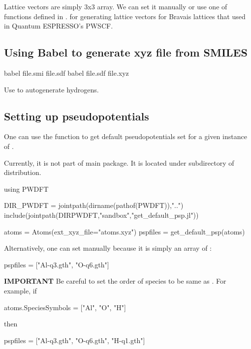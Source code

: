 Lattice vectors are simply 3x3 array. We can set it manually or use
one of functions defined in .
for generating lattice vectors for Bravais lattices that used
in Quantum ESPRESSO's PWSCF.

\subsection*{Using Babel to generate xyz file from SMILES}

\begin{textcode}
babel file.smi file.sdf
babel file.sdf file.xyz
\end{textcode}

Use  to autogenerate hydrogens.



\subsection*{Setting up pseudopotentials}

One can use the function  to get default
pseudopotentials set for a given instance of .

Currently, it is not part of main  package. It is located
under  subdirectory of  distribution.

\begin{juliacode}
using PWDFT

DIR_PWDFT = jointpath(dirname(pathof(PWDFT)),"..")
include(jointpath(DIRPWDFT,"sandbox","get_default_psp.jl"))

atoms = Atoms(ext_xyz_file="atoms.xyz")
pspfiles = get_default_psp(atoms)
\end{juliacode}

Alternatively, one can set  manually because it is simply
an array of :
\begin{juliacode}
pspfiles = ["Al-q3.gth", "O-q6.gth"]
\end{juliacode}

\textbf{IMPORTANT} Be careful to set the order of species to be same as
. For example, if
\begin{juliacode}
atoms.SpeciesSymbols = ["Al", "O", "H"]
\end{juliacode}
then
\begin{juliacode}
pspfiles = ["Al-q3.gth", "O-q6.gth", "H-q1.gth"]
\end{juliacode}

